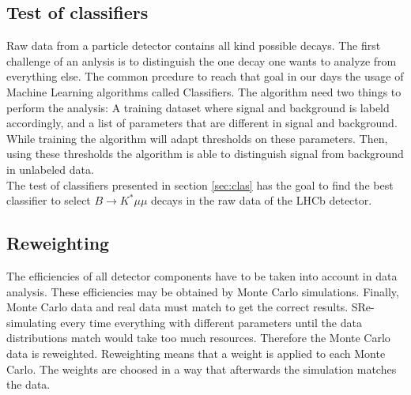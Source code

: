 \documentclass[english]{uzhpub}
\begin{document}
\subsection{Test of classifiers}
Raw data from a particle detector contains all kind possible decays. The first challenge of an anlysis is to distinguish the one decay one wants to analyze from everything else.
The common prcedure to reach that goal in our days the usage of Machine Learning algorithms called Classifiers. The algorithm need two things to perform the analysis: A training dataset where signal and background is labeld accordingly, and a list of parameters that are different in signal and background. While training the algorithm will adapt thresholds on these parameters. Then, using these thresholds the algorithm is able to distinguish signal from background in unlabeled data. \\
The test of classifiers presented in section \ref{sec:clas} has the goal to find the best classifier to select $B \rightarrow K^* \mu \mu$ decays in the raw data of the LHCb detector.

\subsection{Reweighting}
The efficiencies of all detector components have to be taken into account in data analysis. These efficiencies may be obtained by Monte Carlo simulations. Finally, Monte Carlo data and real data must match to get the correct results. SRe-simulating every time everything with different parameters until the data distributions match would take too much resources. Therefore the Monte Carlo data is reweighted. Reweighting means that a weight is applied to each Monte Carlo. The weights are choosed in a way that afterwards the simulation matches the data.








\end{document}
